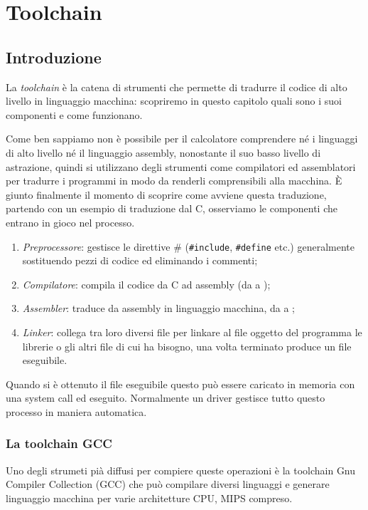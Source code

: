 \documentclass[class=book, crop=false, oneside]{standalone}
\begin{document}
\chapter{Toolchain}

\section{Introduzione}
La \emph{toolchain} è la catena di strumenti che permette di tradurre il codice di alto livello in linguaggio macchina: scopriremo in questo capitolo quali sono i suoi componenti e come funzionano.

Come ben sappiamo non è possibile per il calcolatore comprendere né i linguaggi di alto livello né il linguaggio assembly, nonostante il suo basso livello di astrazione, quindi si utilizzano degli strumenti come compilatori ed assemblatori per tradurre i programmi in modo da renderli comprensibili alla macchina. È giunto finalmente il momento di scoprire come avviene questa traduzione, partendo con un esempio di traduzione dal C, osserviamo le componenti che entrano in gioco nel processo.
\begin{enumerate}
	\item \emph{Preprocessore}: gestisce le direttive \# (\texttt{#include}, \texttt{#define} etc.) generalmente sostituendo pezzi di codice ed eliminando i commenti;
	\item \emph{Compilatore}: compila il codice da C ad assembly (da  a );
	\item \emph{Assembler}: traduce da assembly in linguaggio macchina, da  a ;
	\item \emph{Linker}: collega tra loro diversi file  per linkare al file oggetto del programma le librerie o gli altri file  di cui ha bisogno, una volta terminato produce un file eseguibile.
\end{enumerate}
Quando si è ottenuto il file eseguibile questo può essere caricato in memoria con una system call ed eseguito.
Normalmente un driver gestisce tutto questo processo in maniera automatica.

\subsection*{La toolchain GCC}
Uno degli strumeti pià diffusi per compiere queste operazioni è la toolchain Gnu Compiler Collection (GCC) che può compilare diversi linguaggi e generare linguaggio macchina per varie architetture CPU, MIPS compreso.
\end{document}
